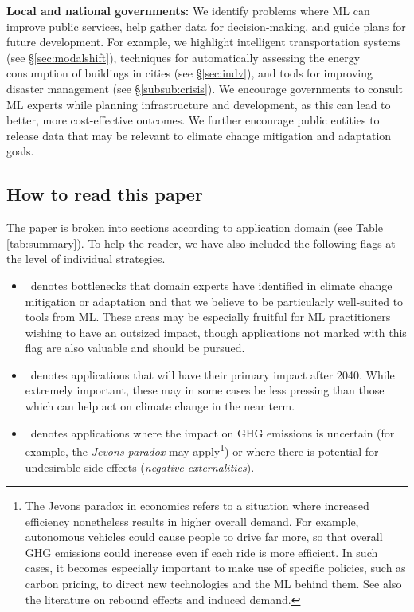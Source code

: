 \documentclass[11pt]{report}
\newcommand{\Rec}{\texorpdfstring{{\small\emph{\color{ccai-blue}{\fbox{High Leverage}}}}}{}}
\newcommand{\HighRisk}{\texorpdfstring{{\small\emph{\color{ccai-yellow-darker}{\fbox{Uncertain Impact}}}}}{}}
\newcommand{\Longterm}{\texorpdfstring{{\small\emph{\color{ccai-green}{\fbox{Long-term}}}}}{}}
\begin{document}
\textbf{Local and national governments:} We identify problems where ML can improve public services, help gather data for decision-making, and guide plans for future development. For example, we highlight intelligent transportation systems (see \S\ref{sec:modalshift}), techniques for automatically assessing the energy consumption of buildings in cities (see \S\ref{sec:indv}),
and tools for improving disaster management (see \S\ref{subsub:crisis}). We encourage governments to consult ML experts while planning infrastructure and development, as this can lead to better, more cost-effective outcomes. We further encourage public entities to release data that may be relevant to climate change mitigation and adaptation goals.\\

\subsection*{How to read this paper} \label{sub:howtoread}
The paper is broken into sections according to application domain (see Table \ref{tab:summary}). To help the reader, we have also included the following flags at the level of individual strategies.
\begin{itemize}
\item \textbf{\Rec} $\,$ denotes bottlenecks that domain experts have identified in climate change mitigation or adaptation and that we believe to be particularly well-suited to tools from ML. These areas may be especially fruitful for ML practitioners wishing to have an outsized impact, though applications not marked with this flag are also valuable and should be pursued.
\item \textbf{\Longterm} $\,$ denotes applications that will have their primary impact after 2040. While extremely important, these may in some cases be less pressing than those which can help act on climate change in the near term.
\item \textbf{\HighRisk} $\,$ denotes applications where the impact on GHG emissions is uncertain (for example, the \emph{Jevons paradox} may apply\footnote{The Jevons paradox in economics refers to a situation where increased efficiency nonetheless results in higher overall demand. For example, autonomous vehicles could cause people to drive far more, so that overall GHG emissions could increase even if each ride is more efficient. In such cases, it becomes especially important to make use of specific policies, such as carbon pricing, to direct new technologies and the ML behind them. See also the literature on rebound effects and induced demand.}) or where there is  potential for undesirable side effects (\emph{negative externalities}).
\end{itemize}
\end{document}
